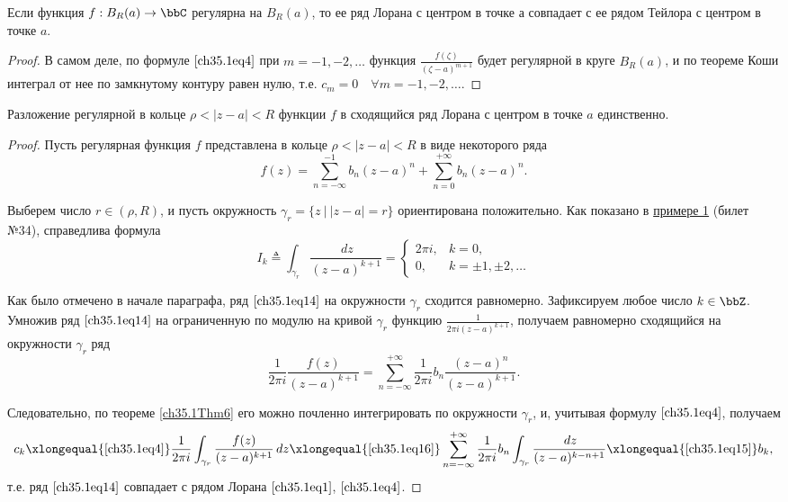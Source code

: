 \begin{cons} \label{ch35.1cons1}
Если функция $f : B_R(a) \to \bbC$ регулярна на $B_R(a)$, то ее ряд Лорана с центром в точке а совпадает с ее рядом Тейлора с центром в точке $a$.
\end{cons}
\begin{proof}
В самом деле, по формуле $\eqref{ch35.1eq4}$ при $m = -1,-2, \ldots$ функция $\frac{f(\zeta)}{(\zeta - a)^{m+1}}$ будет регулярной в круге $B_R(a)$, и по теореме Коши интеграл от нее по замкнутому контуру равен нулю, т.е. $c_m = 0 \quad \forall m = -1,-2, \ldots$.
\end{proof}

\begin{thm} \label{Ch35.1Thm2}
Разложение регулярной в кольце $\rho < |z - a| < R$ функции $f$ в сходящийся ряд Лорана с центром в точке $a$ единственно.
\end{thm}

\begin{proof}
Пусть регулярная функция $f$ представлена в кольце $\rho < |z - a| < R$ в виде некоторого ряда
\begin{equation} \label{ch35.1eq14}
f(z) = \sum_{n = -\infty}^{-1} b_n (z - a)^n + \sum_{n = 0}^{+\infty} b_n (z - a)^n.
\end{equation}

Выберем число $r \in (\rho, R)$, и пусть окружность $\gamma_r = \{ z \: \big| \: |z - a| = r\}$ ориентирована положительно. Как показано в \hyperref[exmpl1]{примере 1} (билет №34), справедлива формула
\begin{equation} \label{ch35.1eq15}
I_k \triangleq \int_{\gamma_r} \frac{\,dz}{(z - a)^{k + 1}} = 
\begin{cases}
2\pi i, & k = 0, \\
0, & k = \pm1, \pm2, \ldots
\end{cases}
\end{equation}

Как было отмечено в начале параграфа, ряд $\eqref{ch35.1eq14}$ на окружности $\gamma_r$ сходится равномерно. Зафиксируем любое число $k \in \bbZ$. Умножив ряд $\eqref{ch35.1eq14}$ на ограниченную по модулю на кривой $\gamma_r$ функцию $\frac{1}{2\pi i(z - a)^{k + 1}}$, получаем равномерно сходящийся на окружности $\gamma_r$ ряд
\begin{equation} \label{ch35.1eq16}
\frac{1}{2\pi i} \frac{f(z)}{(z - a)^{k + 1}} = \sum_{n = -\infty}^{+\infty} \frac{1}{2\pi i} b_n \frac{(z-a)^n}{(z - a)^{k + 1}}.
\end{equation}

Следовательно, по теореме \ref{ch35.1Thm6} его можно почленно интегрировать по окружности $\gamma_r$, и, учитывая формулу $\eqref{ch35.1eq4}$, получаем
$$
c_k \xlongequal{\eqref{ch35.1eq4}} \frac{1}{2\pi i} \int_{\gamma_r} \frac{f(z)}{(z - a)^{k + 1}} \,dz \xlongequal{\eqref{ch35.1eq16}} \sum_{n = -\infty}^{+\infty} \frac{1}{2\pi i} b_n \int_{\gamma_r} \frac{\,dz}{(z - a)^{k - n + 1}} \xlongequal{\eqref{ch35.1eq15}} b_k,
$$
т.е. ряд $\eqref{ch35.1eq14}$ совпадает с рядом Лорана $\eqref{ch35.1eq1}$, $\eqref{ch35.1eq4}$.
\end{proof}


